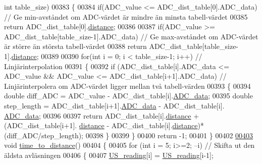 \begin{DoxyCode}
       \textcolor{keywordtype}{int} table\_size)
00383 \{
00384     \textcolor{keywordflow}{if}(ADC\_value <= ADC\_dist\_table[0].ADC\_data)                 \textcolor{comment}{// Ge min-avståndet om ADC-värdet är mindre
       än minsta tabell-värdet}
00385     \textcolor{keywordflow}{return} ADC\_dist\_table[0].\hyperlink{struct_a_d_c__distance__pair_a79b8e036dca6911e3295a47d99f21f43}{distance};
00386 
00387     \textcolor{keywordflow}{if}(ADC\_value >= ADC\_dist\_table[table\_size-1].ADC\_data)      \textcolor{comment}{// Ge max-avståndet om ADC-värdet är större
       än största tabell-värdet}
00388     \textcolor{keywordflow}{return} ADC\_dist\_table[table\_size-1].\hyperlink{struct_a_d_c__distance__pair_a79b8e036dca6911e3295a47d99f21f43}{distance};
00389 
00390     \textcolor{keywordflow}{for}(\textcolor{keywordtype}{int} i = 0; i < table\_size-1; i++)                       \textcolor{comment}{// Linjärinterpolation}
00391     \{
00392         \textcolor{keywordflow}{if} (ADC\_dist\_table[i].ADC\_data <= ADC\_value && ADC\_value <= ADC\_dist\_table[i+1].ADC\_data) \textcolor{comment}{//
       Linjärinterpolera om ADC-värdet ligger mellan två tabell-värden}
00393         \{
00394             \textcolor{keywordtype}{double} diff\_ADC = ADC\_value - ADC\_dist\_table[i].\hyperlink{struct_a_d_c__distance__pair_aa001cc67b1ec73e43eb6bd32d24a739b}{ADC\_data};
00395             \textcolor{keywordtype}{double} step\_length = ADC\_dist\_table[i+1].\hyperlink{struct_a_d_c__distance__pair_aa001cc67b1ec73e43eb6bd32d24a739b}{ADC\_data} - ADC\_dist\_table[i].
      \hyperlink{struct_a_d_c__distance__pair_aa001cc67b1ec73e43eb6bd32d24a739b}{ADC\_data};
00396 
00397             \textcolor{keywordflow}{return} ADC\_dist\_table[i].\hyperlink{struct_a_d_c__distance__pair_a79b8e036dca6911e3295a47d99f21f43}{distance} + (ADC\_dist\_table[i+1].
      \hyperlink{struct_a_d_c__distance__pair_a79b8e036dca6911e3295a47d99f21f43}{distance} - ADC\_dist\_table[i].\hyperlink{struct_a_d_c__distance__pair_a79b8e036dca6911e3295a47d99f21f43}{distance})*(diff\_ADC/step\_length);
00398         \}
00399     \}
00400     \textcolor{keywordflow}{return} -1;
00401 \}
00402 
\hypertarget{sensor_8c_source.tex_l00403}{}\hyperlink{sensor_8h_a4400365e5a5de20eeaf4e78531e39e9b}{00403} \textcolor{keywordtype}{void} \hyperlink{sensor_8c_a4400365e5a5de20eeaf4e78531e39e9b}{time\_to\_distance}()
00404 \{
00405     \textcolor{keywordflow}{for} (\textcolor{keywordtype}{int} i = 5; i>=2; --i)      \textcolor{comment}{// Skifta ut den äldsta avläsningen}
00406     \{
00407         \hyperlink{sensor_8h_a2f6715b10308bb971461584c206dfde7}{US\_reading}[i] = \hyperlink{sensor_8h_a2f6715b10308bb971461584c206dfde7}{US\_reading}[i-1];

\end{DoxyCode}
